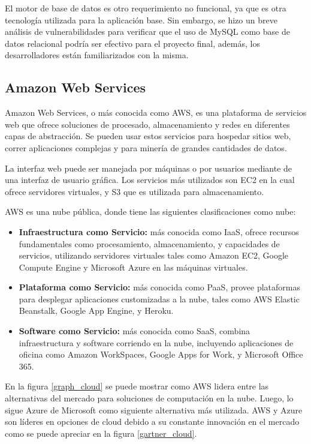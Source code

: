 El motor de base de datos es otro requerimiento no funcional, ya que es otra tecnología utilizada para la aplicación base. Sin embargo, se hizo un breve análisis de vulnerabilidades para verificar que el uso de MySQL como base de datos relacional podría ser efectivo para el proyecto final, además, los desarrolladores están familiarizados con la misma.

\subsection{Amazon Web Services}
Amazon Web Services, o más conocida como AWS, es una plataforma de servicios web que ofrece soluciones de procesado, almacenamiento y redes en diferentes capas de abstracción. Se pueden usar estos servicios para hospedar sitios web, correr aplicaciones complejas y para minería de grandes cantidades de datos\citep{wittig2015amazon}. 

La interfaz web puede ser manejada por máquinas o por usuarios mediante de una interfaz de usuario gráfica. Los servicios más utilizados son EC2 en la cual ofrece servidores virtuales, y S3 que es utilizada para almacenamiento.

AWS es una nube pública, donde tiene las siguientes clasificaciones como nube:
\begin{itemize}
	\item \textbf{Infraestructura como Servicio:} más conocida como IaaS, ofrece recursos fundamentales como procesamiento, almacenamiento, y capacidades de servicios, utilizando servidores virtuales tales como Amazon EC2, Google Compute Engine y Microsoft Azure en las máquinas virtuales.
	\item \textbf{Plataforma como Servicio:} más conocida como PaaS, provee plataformas para desplegar aplicaciones customizadas a la nube, tales como AWS Elastic Beanstalk, Google App Engine, y Heroku.
	\item \textbf{Software como Servicio:} más conocida como SaaS, combina infraestructura y software corriendo en la nube, incluyendo aplicaciones de oficina como Amazon WorkSpaces, Google Apps for Work, y Microsoft Office 365.
\end{itemize}

En la figura \ref{graph_cloud} se puede mostrar como AWS lidera entre las alternativas del mercado para soluciones de computación en la nube. Luego, lo sigue Azure de Microsoft como siguiente alternativa más utilizada. AWS y Azure son líderes en opciones de cloud debido a su constante innovación en el mercado como se puede apreciar en la figura \ref{gartner_cloud}.

